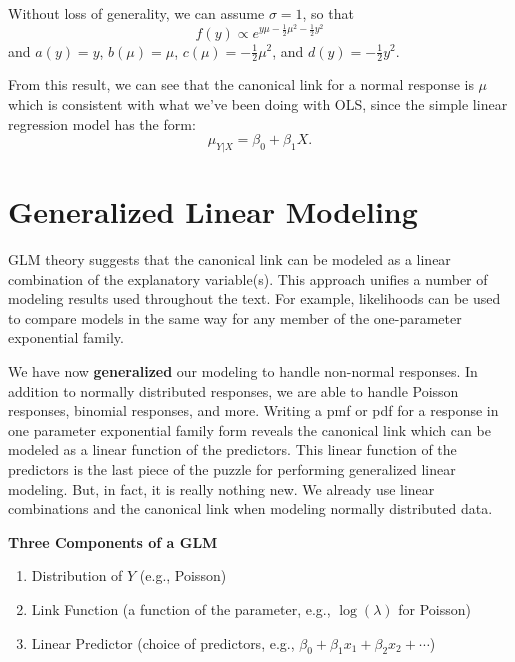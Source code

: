 \documentclass[
]{krantz}
\providecommand{\tightlist}{%
  \setlength{\itemsep}{0pt}\setlength{\parskip}{0pt}}
\renewenvironment{quote}{\begin{VF}}{\end{VF}}
\begin{document}
Without loss of generality, we can assume \(\sigma=1\), so that
\[
f(y) \propto e^{y\mu - \frac{1}{2} \mu^2 - \frac{1}{2} y^2}
\]
and \(a(y)=y\), \(b(\mu)=\mu\), \(c(\mu)= -\frac{1}{2}\mu^2\), and \(d(y) = - \frac{1}{2} y^2\).

From this result, we can see that the canonical link for a normal response is \(\mu\) which is consistent with what we've been doing with OLS, since the simple linear regression model has the form:
\[ \mu_{Y|X} = \beta_0 + \beta_1X. \]

\hypertarget{generalized-linear-modeling}{%
\section{Generalized Linear Modeling}\label{generalized-linear-modeling}}

GLM theory suggests that the canonical link can be modeled as a linear combination of the explanatory variable(s). This approach unifies a number of modeling results used throughout the text. For example, likelihoods can be used to compare models in the same way for any member of the one-parameter exponential family.

We have now \textbf{generalized} our modeling to handle non-normal responses. In addition to normally distributed responses, we are able to handle Poisson responses, binomial responses, and more. Writing a pmf or pdf for a response in one parameter exponential family form reveals the canonical link which can be modeled as a linear function of the predictors. This linear function of the predictors is the last piece of the puzzle for performing generalized linear modeling. But, in fact, it is really nothing new. We already use linear combinations and the canonical link when modeling normally distributed data.

\textbf{Three Components of a GLM}

\begin{quote}
\begin{enumerate}
\def\labelenumi{\arabic{enumi}.}
\tightlist
\item
  Distribution of \(Y\) (e.g., Poisson)
\item
  Link Function (a function of the parameter, e.g., \(\log(\lambda)\) for Poisson)
\item
  Linear Predictor (choice of predictors,
  e.g., \(\beta_0 + \beta_1 x_1 + \beta_2 x_2 + \cdots\))
\end{enumerate}
\end{quote}
\end{document}

